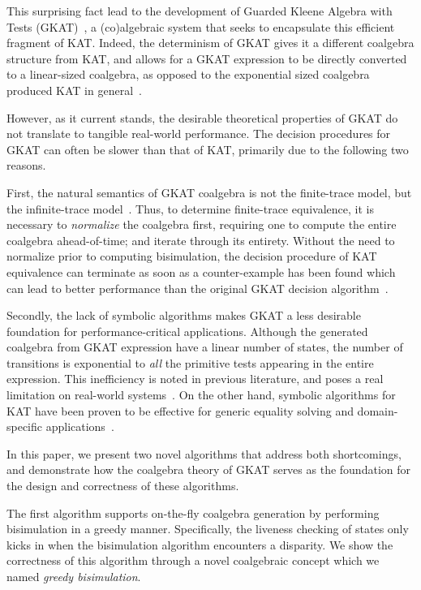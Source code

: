 \documentclass[conference]{IEEEtran}
\begin{document}
This surprising fact lead to the development of Guarded Kleene Algebra with Tests (GKAT)~\cite{smolka_GuardedKleeneAlgebra_2020}, a (co)algebraic system that seeks to encapsulate this efficient fragment of KAT.
Indeed, the determinism of GKAT gives it a different coalgebra structure from KAT, and allows for a GKAT expression to be directly converted to a linear-sized coalgebra, as opposed to the exponential sized coalgebra produced KAT in general~\cite{smolka_GuardedKleeneAlgebra_2020,kozen_CoalgebraicTheoryKleene_2017}.

However, as it current stands, the desirable theoretical properties of GKAT do not translate to tangible real-world performance. 
The decision procedures for GKAT can often be slower than that of KAT, primarily due to the following two reasons.

First, the natural semantics of GKAT coalgebra is not the finite-trace model, but the infinite-trace model~\cite{smolka_GuardedKleeneAlgebra_2020,schmid_GuardedKleeneAlgebra_2021}.
Thus, to determine finite-trace equivalence, it is necessary to \emph{normalize} the coalgebra first, requiring one to compute the entire coalgebra ahead-of-time; and iterate through its entirety.
Without the need to normalize prior to computing bisimulation, the decision procedure of KAT equivalence can terminate as soon as a counter-example has been found which can lead to better performance than the original GKAT decision algorithm~\cite{smolka_GuardedKleeneAlgebra_2020}.

Secondly, the lack of symbolic algorithms makes GKAT a less desirable foundation for performance-critical applications.
Although the generated coalgebra from GKAT expression have a linear number of states, the number of transitions is exponential to \emph{all} the primitive tests appearing in the entire expression.
This inefficiency is noted in previous literature, and poses a real limitation on real-world systems~\cite{smolka_GuardedKleeneAlgebra_2020,zhang_CFGKATEfficientValidation_2025}.
On the other hand, symbolic algorithms for KAT have been proven to be effective for generic equality solving and domain-specific applications~\cite{pous_SymbolicAlgorithmsLanguage_2015,moeller_KATchFastSymbolic_2024}.

In this paper, we present two novel algorithms that address both shortcomings, and demonstrate how the coalgebra theory of GKAT serves as the foundation for the design and correctness of these algorithms.

The first algorithm supports on-the-fly coalgebra generation by performing bisimulation in a greedy manner.
Specifically, the liveness checking of states only kicks in when the bisimulation algorithm encounters a disparity.
We show the correctness of this algorithm through a novel coalgebraic concept which we named \emph{greedy bisimulation}.
\end{document}
